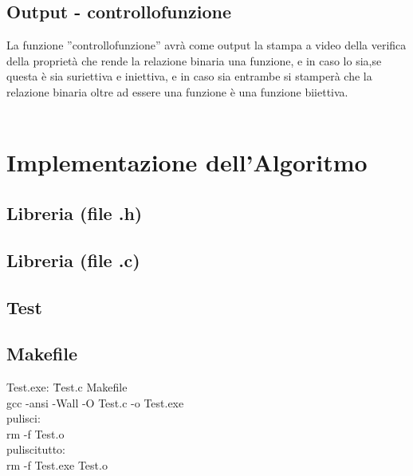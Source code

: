 \documentclass[11pt, a4paper, titlepage, block]{article}
\begin{document}
	\subsection{Output - controllo\textunderscore funzione}
	La funzione ”controllo\textunderscore funzione” avr\`a  come output la stampa a video della verifica della propriet\`a  che rende la relazione binaria una funzione, e in caso lo sia,se questa \`e  sia suriettiva e iniettiva, e in caso sia entrambe si stamper\`a  che la relazione binaria oltre ad essere una funzione \`e  una funzione biiettiva.\\
	\\
	\newpage
	\section{Implementazione dell'Algoritmo}
	\subsection{Libreria  (file .h) }
	\lstset{numbers=left, tabsize=2,breaklines=true, language=C}
	 
	\newpage
	\subsection{Libreria  (file .c) }
	\lstset{numbers=left, tabsize=2,breaklines=true, language=C}
	 
	\newpage	
	\subsection{Test}
	\lstset{numbers=left, tabsize=2,breaklines=true, language=C}
	
	\newpage
\subsection{Makefile}
\begin{tabbing}
	Test.exe: \=Test.c Makefile\\
	\>gcc -ansi -Wall -O Test.c -o Test.exe\\
	pulisci:\\
	\>rm -f Test.o\\
	pulisci\textunderscore tutto:\\
	\>rm -f Test.exe Test.o\\
\end{tabbing}
	
	
	
	
	
	
	
\end{document}

